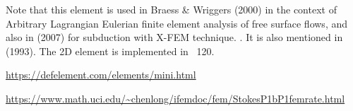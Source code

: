Note that this element is used in Braess \& Wriggers (2000) \cite{brwr00} 
in the context of Arbitrary Lagrangian Eulerian 
finite element analysis of free surface flows, and also 
in \textcite{zldf07} (2007) for subduction with X-FEM technique. 
. It is also mentioned in \textcite{nath93} (1993).
The 2D element is implemented in \stone~120.

\begin{center}
\url{https://defelement.com/elements/mini.html}
\end{center}

\url{https://www.math.uci.edu/~chenlong/ifemdoc/fem/StokesP1bP1femrate.html}
